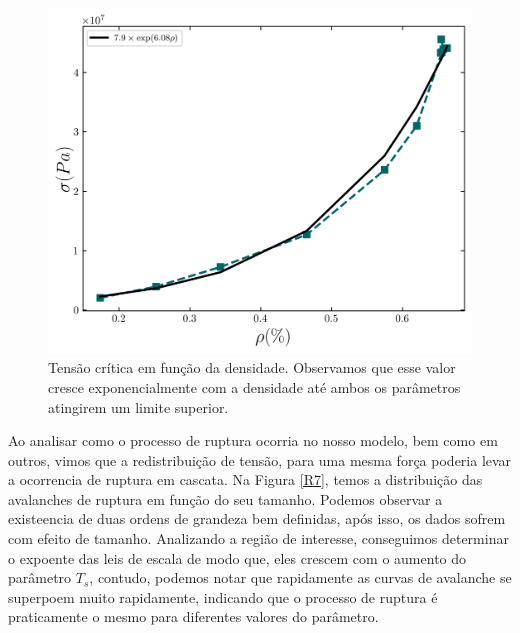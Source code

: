 \documentclass{article}
\begin{document}
\begin{figure}[H]
    \centering
    \includegraphics[width=\textwidth]{figures/sigma_rho.png}

    \caption{Tensão crítica em função da densidade. Observamos que esse valor cresce exponencialmente com a densidade até ambos os parâmetros atingirem um limite superior.} 


    \label{R6}
\end{figure}

Ao analisar como o processo de ruptura ocorria no nosso modelo, bem como em outros, vimos que a redistribuição de tensão, para uma mesma força
poderia levar a ocorrencia de ruptura em cascata. Na Figura \ref*{R7}, temos a distribuição das avalanches de ruptura em função do seu tamanho.
Podemos observar a existeencia de duas ordens de grandeza bem definidas, após isso, os dados sofrem com efeito de tamanho.
Analizando a região de interesse, conseguimos determinar o expoente das leis de escala de modo que,
eles crescem com o aumento do parâmetro $T_{s}$, contudo, podemos notar que rapidamente as curvas de
avalanche se superpoem muito rapidamente, indicando que o processo de ruptura é praticamente o mesmo
para diferentes valores do parâmetro. 
\end{document}
